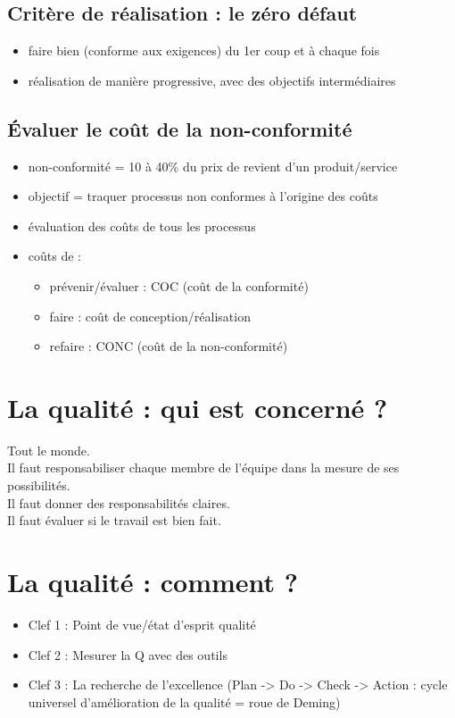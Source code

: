 		\subsection{Critère de réalisation : le zéro défaut}
			\begin{itemize}
			\item faire bien (conforme aux exigences) du 1er coup et à chaque fois
			\item réalisation de manière progressive, avec des objectifs intermédiaires
			\end{itemize}
		\subsection{Évaluer le coût de la non-conformité}
			\begin{itemize}
			\item non-conformité = 10 à 40\% du prix de revient d’un produit/service
			\item objectif = traquer processus non conformes à l’origine des coûts
			\item évaluation des coûts de tous les processus
			\item coûts de : 
				\begin{itemize}
				\item prévenir/évaluer : COC (coût de la conformité)
				\item faire : coût de conception/réalisation
				\item refaire : CONC (coût de la non-conformité)	
				\end{itemize}
			\end{itemize}
	
	\section{La qualité : qui est concerné ?}
		Tout le monde. \\
		Il faut responsabiliser chaque membre de l’équipe dans la mesure de ses possibilités. \\
		Il faut donner des responsabilités claires. \\
		Il faut évaluer si le travail est bien fait. \\
	
	\section{La qualité : comment ?}
		\begin{itemize}
		\item Clef 1 : Point de vue/état d’esprit qualité
		\item Clef 2 : Mesurer la Q avec des outils 
		\item Clef 3 : La recherche de l’excellence (Plan -> Do -> Check -> Action : cycle universel d’amélioration de la qualité = roue de Deming)
		\end{itemize}

